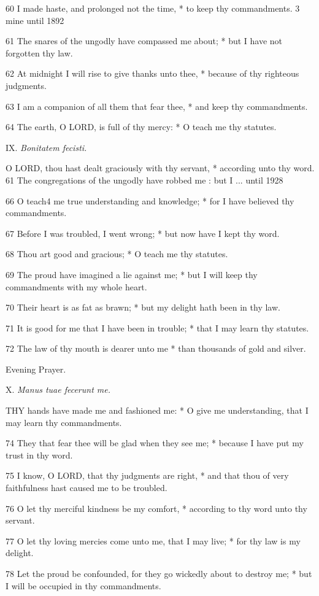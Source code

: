 60 I made haste, and prolonged not the time, * to keep
thy commandments. 3
mine
until 1892

61 The snares of the ungodly have compassed me about; * but I have not forgotten
thy law.

62 At midnight I will rise to give thanks unto thee,
* because of thy righteous judgments.

63 I am a companion of all them that fear thee, * and
keep thy commandments.

64 The earth, O LORD, is full of thy mercy: * O teach
me thy statutes.

IX.
\emph{Bonitatem fecisti.}

O
LORD, thou hast dealt graciously with thy servant, * according unto thy
word. 61 The congregations of the
ungodly have robbed me : but I ... until
1928

66 O teach4 me true understanding and knowledge; * for I have
believed thy commandments.

67 Before I was troubled, I went wrong; * but now have
I kept thy word.

68 Thou art good and gracious; * O teach me thy statutes.

69 The proud have imagined a lie against me; * but I
will keep thy commandments with my whole heart.

70 Their heart is as fat as brawn; * but my delight hath
been in thy law.

71 It is good for me that I have been in trouble; * that
I may learn thy statutes.

72 The law of thy mouth is dearer unto me * than thousands
of gold and silver.

Evening Prayer.

X. \emph{Manus
tuae fecerunt me.}

THY
hands have made me and fashioned me: * O give me understanding, that I
may learn thy commandments.

74 They that fear thee will be glad when they see me;
* because I have put my trust in thy word.

75 I know, O LORD, that thy judgments are right, *
and that thou of very faithfulness hast caused me to be troubled.

76 O let thy merciful kindness be my comfort, * according
to thy word unto thy servant.

77 O let thy loving mercies come unto me, that I may
live; * for thy law is my delight.

78 Let the proud be confounded, for they go wickedly
about to destroy me; * but I will be occupied in thy commandments.

